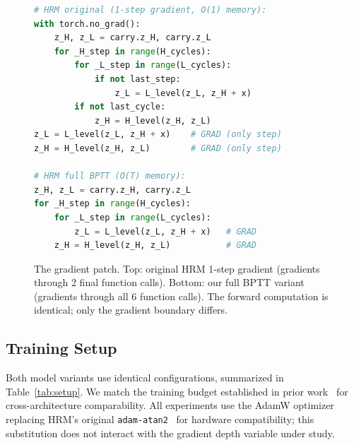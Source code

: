 \documentclass{article}
\begin{document}
\begin{figure}[t]
\centering
\begin{lstlisting}[language=Python, basicstyle=\footnotesize\ttfamily, frame=single]
# HRM original (1-step gradient, O(1) memory):
with torch.no_grad():
    z_H, z_L = carry.z_H, carry.z_L
    for _H_step in range(H_cycles):
        for _L_step in range(L_cycles):
            if not last_step:
                z_L = L_level(z_L, z_H + x)
        if not last_cycle:
            z_H = H_level(z_H, z_L)
z_L = L_level(z_L, z_H + x)    # GRAD (only step)
z_H = H_level(z_H, z_L)        # GRAD (only step)

# HRM full BPTT (O(T) memory):
z_H, z_L = carry.z_H, carry.z_L
for _H_step in range(H_cycles):
    for _L_step in range(L_cycles):
        z_L = L_level(z_L, z_H + x)   # GRAD
    z_H = H_level(z_H, z_L)           # GRAD
\end{lstlisting}
\caption{The gradient patch. Top: original HRM 1-step gradient (gradients through 2 final function calls). Bottom: our full BPTT variant (gradients through all 6 function calls). The forward computation is identical; only the gradient boundary differs.}
\label{fig:patch}
\end{figure}

\subsection{Training Setup}

Both model variants use identical configurations, summarized in Table~\ref{tab:setup}. We match the training budget established in prior work~\cite{jj2025disentangling} for cross-architecture comparability. All experiments use the AdamW optimizer~\cite{loshchilov2019adamw} replacing HRM's original \texttt{adam-atan2}~\cite{adamatan2} for hardware compatibility; this substitution does not interact with the gradient depth variable under study.
\end{document}
